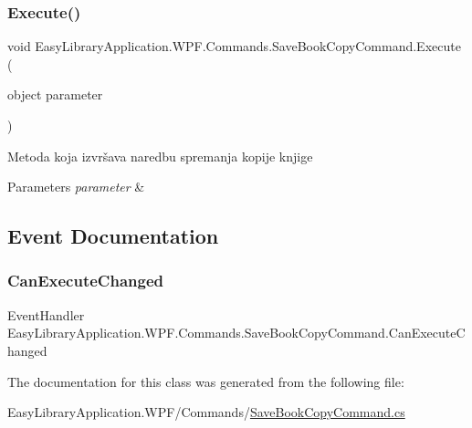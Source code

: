 \subsubsection{\texorpdfstring{Execute()}{Execute()}}
{\footnotesize\ttfamily void Easy\+Library\+Application.\+W\+P\+F.\+Commands.\+Save\+Book\+Copy\+Command.\+Execute (\begin{DoxyParamCaption}\item[{object}]{parameter }\end{DoxyParamCaption})}



Metoda koja izvršava naredbu spremanja kopije knjige 


\begin{DoxyParams}{Parameters}
{\em parameter} & \\
\hline
\end{DoxyParams}


\subsection{Event Documentation}
\mbox{\label{class_easy_library_application_1_1_w_p_f_1_1_commands_1_1_save_book_copy_command_ac0a9eac345f0b63570f1ad95e58788e4}} 
\subsubsection{\texorpdfstring{Can\+Execute\+Changed}{CanExecuteChanged}}
{\footnotesize\ttfamily Event\+Handler Easy\+Library\+Application.\+W\+P\+F.\+Commands.\+Save\+Book\+Copy\+Command.\+Can\+Execute\+Changed}



The documentation for this class was generated from the following file\+:\begin{DoxyCompactItemize}
\item 
Easy\+Library\+Application.\+W\+P\+F/\+Commands/\mbox{\hyperlink{_save_book_copy_command_8cs}{Save\+Book\+Copy\+Command.\+cs}}\end{DoxyCompactItemize}
